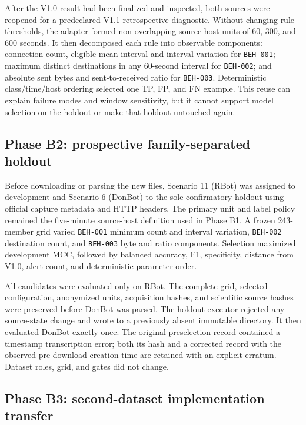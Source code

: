 \documentclass[11pt,a4paper,onecolumn]{IEEEtran}
\begin{document}
After the V1.0 result had been finalized and inspected, both sources were reopened for a predeclared V1.1 retrospective diagnostic. Without changing rule thresholds, the adapter formed non-overlapping source-host units of 60, 300, and 600 seconds. It then decomposed each rule into observable components: connection count, eligible mean interval and interval variation for \texttt{BEH-001}; maximum distinct destinations in any 60-second interval for \texttt{BEH-002}; and absolute sent bytes and sent-to-received ratio for \texttt{BEH-003}. Deterministic class/time/host ordering selected one TP, FP, and FN example. This reuse can explain failure modes and window sensitivity, but it cannot support model selection on the holdout or make that holdout untouched again.

\subsection{Phase B2: prospective family-separated holdout}

Before downloading or parsing the new files, Scenario 11 (RBot) was assigned to development and Scenario 6 (DonBot) to the sole confirmatory holdout using official capture metadata and HTTP headers. The primary unit and label policy remained the five-minute source-host definition used in Phase B1. A frozen 243-member grid varied \texttt{BEH-001} minimum count and interval variation, \texttt{BEH-002} destination count, and \texttt{BEH-003} byte and ratio components. Selection maximized development MCC, followed by balanced accuracy, F1, specificity, distance from V1.0, alert count, and deterministic parameter order.

All candidates were evaluated only on RBot. The complete grid, selected configuration, anonymized units, acquisition hashes, and scientific source hashes were preserved before DonBot was parsed. The holdout executor rejected any source-state change and wrote to a previously absent immutable directory. It then evaluated DonBot exactly once. The original preselection record contained a timestamp transcription error; both its hash and a corrected record with the observed pre-download creation time are retained with an explicit erratum. Dataset roles, grid, and gates did not change.

\subsection{Phase B3: second-dataset implementation transfer}
\end{document}

